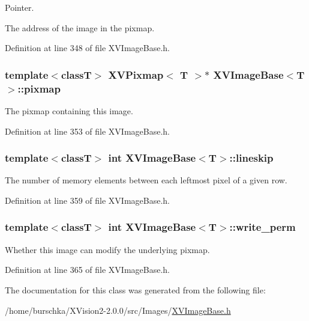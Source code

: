 Pointer.

The address of the image in the pixmap. 

Definition at line 348 of file XVImage\-Base.h.\label{XVImageBase_n1}
\hypertarget{class_XVImageBase_n1}{
\subsubsection[pixmap]{\setlength{\rightskip}{0pt plus 5cm}template$<$classT$>$ XVPixmap$<$ T $>$$\ast$ XVImage\-Base$<$T$>$::pixmap}}


The pixmap containing this image.



Definition at line 353 of file XVImage\-Base.h.\label{XVImageBase_n2}
\hypertarget{class_XVImageBase_n2}{
\subsubsection[lineskip]{\setlength{\rightskip}{0pt plus 5cm}template$<$classT$>$ int XVImage\-Base$<$T$>$::lineskip}}


The number of memory elements between each leftmost pixel of a given row.



Definition at line 359 of file XVImage\-Base.h.\label{XVImageBase_n3}
\hypertarget{class_XVImageBase_n3}{
\subsubsection[write_perm]{\setlength{\rightskip}{0pt plus 5cm}template$<$classT$>$ int XVImage\-Base$<$T$>$::write\_\-perm}}


Whether this image can modify the underlying pixmap.



Definition at line 365 of file XVImage\-Base.h.

The documentation for this class was generated from the following file:\begin{CompactItemize}
\item 
/home/burschka/XVision2-2.0.0/src/Images/\hyperlink{XVImageBase.h-source}{XVImage\-Base.h}\end{CompactItemize}
